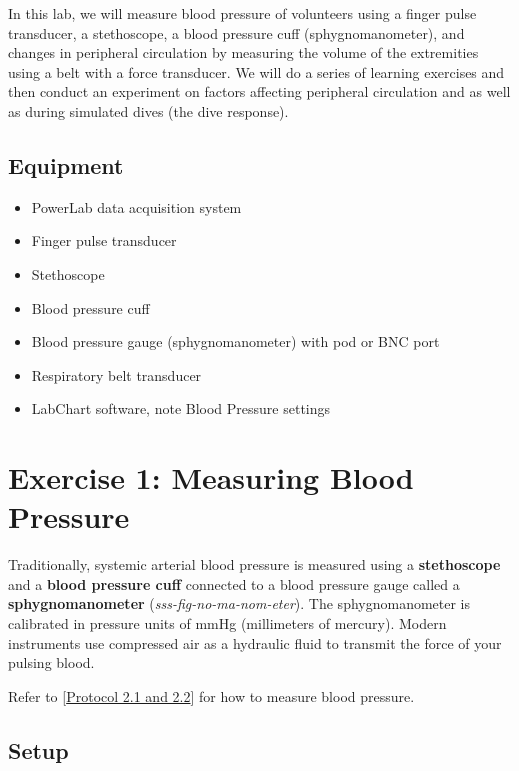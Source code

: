 \documentclass[
  letterpaper,
  DIV=11,
  numbers=noendperiod,
  oneside]{scrartcl}
\providecommand{\tightlist}{%
  \setlength{\itemsep}{0pt}\setlength{\parskip}{0pt}}\usepackage{longtable,booktabs,array}
\begin{document}
In this lab, we will measure blood pressure of volunteers using a finger
pulse transducer, a stethoscope, a blood pressure cuff
(sphygnomanometer), and changes in peripheral circulation by measuring
the volume of the extremities using a belt with a force transducer. We
will do a series of learning exercises and then conduct an experiment on
factors affecting peripheral circulation and as well as during simulated
dives (the dive response).

\hypertarget{equipment}{%
\subsection{Equipment}\label{equipment}}

\begin{itemize}
\tightlist
\item
  PowerLab data acquisition system
\item
  Finger pulse transducer
\item
  Stethoscope
\item
  Blood pressure cuff
\item
  Blood pressure gauge (sphygnomanometer) with pod or BNC port
\item
  Respiratory belt transducer
\item
  LabChart software, note Blood Pressure settings
\end{itemize}

\hypertarget{exercise-1-measuring-blood-pressure}{%
\section{Exercise 1: Measuring Blood
Pressure}\label{exercise-1-measuring-blood-pressure}}

Traditionally, systemic arterial blood pressure is measured using a
\textbf{stethoscope} and a \textbf{blood pressure cuff} connected to a
blood pressure gauge called a \textbf{sphygnomanometer}
(\emph{sss-fig-no-ma-nom-eter}). The sphygnomanometer is calibrated in
pressure units of mmHg (millimeters of mercury). Modern instruments use
compressed air as a hydraulic fluid to transmit the force of your
pulsing blood.

Refer to {[}\href{../Protocols/p2-measuring-blood-pressure.pdf}{Protocol
2.1 and 2.2}{]} for how to measure blood pressure.

\hypertarget{setup}{%
\subsection{Setup}\label{setup}}
\end{document}
